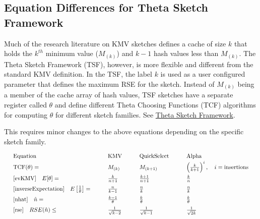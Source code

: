 %
\subsection{Equation Differences for Theta Sketch Framework}
Much of the research literature on KMV sketches defines a cache of size $k$ that holds the $k^{th}$ minimum value ($M_{(k)}$) and $k-1$ hash values less than $M_{(k)}$.  
The Theta Sketch Framework (TSF), however, is more flexible and different from the standard KMV definition.
In the TSF, the label $k$ is used as a user configured parameter that defines the maximum RSE for the sketch. 
Instead of $M_{(k)}$ being a member of the cache array of hash values, 
TSF sketches have a separate register called $\theta$ and define different Theta Choosing Functions (TCF) algorithms for computing $\theta$ for different sketch families. 
See \href{http://datasketches.github.io/docs/ThetaSketchFramework.pdf}{Theta Sketch Framework}.

This requires minor changes to the above equations depending on the specific sketch family.
\begin{equation*}
\arraycolsep=15pt
\renewcommand\arraystretch{1.5}
\begin{array}{llll}
\text{Equation}                                                 & \text{KMV}            & \text{QuickSelect}   & \text{Alpha} \\
\text{TCF}(\theta) =                                            & M_{(k)}               & M_{(k+1)}            & \left(\frac{k}{k+1}\right)^i, \quad i=\text{insertions}\\
\ref{evKMV} \quad E[\theta] =                                   & \frac{k}{n+1}         & \frac{k+1}{n+1}      & \frac{k}{n} \\ 
\ref{inverseExpectation} \quad E\left[\frac{1}{\theta}\right] = & \frac{n}{k-1}         & \frac{n}{k}          & \frac{n}{k} \\
\ref{nhat} \quad \hat{n} =                                      & \frac{k-1}{\theta}    & \frac{k}{\theta}     & \frac{k}{\theta} \\
\ref{rse}  \quad RSE(\hat{n})\leq                               & \frac{1}{\sqrt{k-2}}  & \frac{1}{\sqrt{k-1}} & \frac{1}{\sqrt{2k}} \\
\end{array}
\end{equation*}